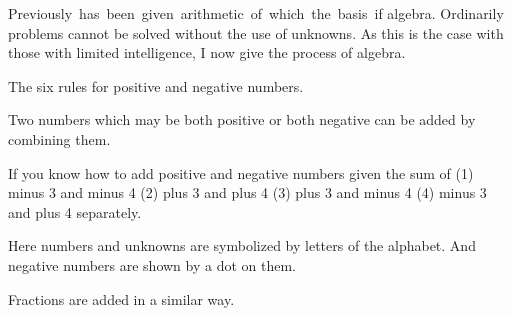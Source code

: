 \documentclass[]{article}
\begin{document}
Previously \,has \,been \,given \,arithmetic \,of \,which \,the \,basis \,if algebra.
Ordinarily problems cannot be solved without the use of unknowns. As
this is the case with those with limited intelligence, I now give the
process of algebra.

\vspace{20pt}
\begin{center}
\begin{Large}
 \label{dha}
{}
\end{Large}
\end{center}
\vspace{5pt}

The six rules for positive and negative numbers.

\begin{quote}  {
}  \end{quote}

Two numbers which may be both positive or both negative can be added by
combining them.

\begin{quote}  {
}  \end{quote}
\newpage
\setcounter{page}{8}
\large

If you know how to add positive and negative numbers given the sum of (1) minus 3 and minus 4 (2) plus 3 and plus 4 (3) plus 3 and minus 4 (4) minus 3 and plus 4 separately.

\begin{quote}  {
}  \end{quote}

Here numbers and unknowns are symbolized by letters of the alphabet.
And negative numbers are shown by a dot on them. 

\begin{quote}  {
}  \end{quote}

Fractions are added in a similar way.
\end{document}
